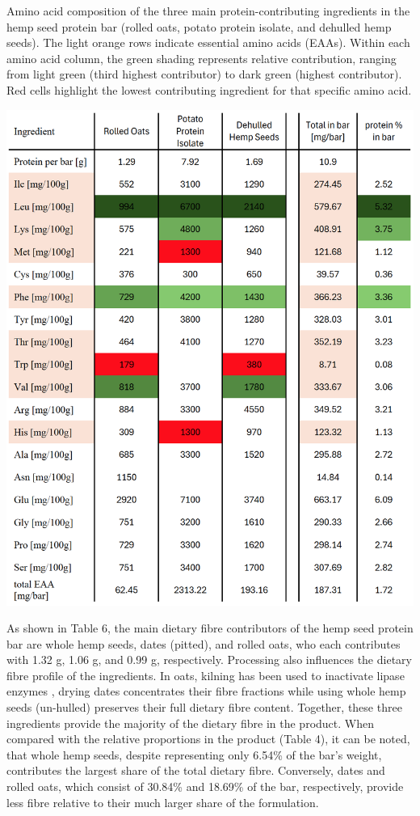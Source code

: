 \begin{table}[H]
    \caption{Amino acid composition of the three main protein-contributing ingredients in the hemp seed protein bar (rolled oats, potato protein isolate, and dehulled hemp seeds). The light orange rows indicate essential amino acids (EAAs). Within each amino acid column, the green shading represents relative contribution, ranging from light green (third highest contributor) to dark green (highest contributor). Red cells highlight the lowest contributing ingredient for that specific amino acid.}
\label{tab:df_amino_acids_01}
\includegraphics[width=\linewidth]{Figures/tab_amino_acid_01.png}
\end{table}

\vspace{1em}
As shown in Table 6, the main dietary fibre contributors of the hemp seed protein bar are whole hemp seeds, dates (pitted), and rolled oats, who each contributes with 1.32 g, 1.06 g, and 0.99 g, respectively. Processing also influences the dietary fibre profile of the ingredients. In oats, kilning has been used to inactivate lipase enzymes \cite*{art_24_oat_kilning}, drying dates concentrates their fibre fractions while using whole hemp seeds (un-hulled) preserves their full dietary fibre content. Together, these three ingredients provide the majority of the dietary fibre in the product. When compared with the relative proportions in the product (Table 4), it can be noted, that whole hemp seeds, despite representing only 6.54\% of the bar’s weight, contributes the largest share of the total dietary fibre. Conversely, dates and rolled oats, which consist of 30.84\% and 18.69\% of the bar, respectively, provide less fibre relative to their much larger share of the formulation.

